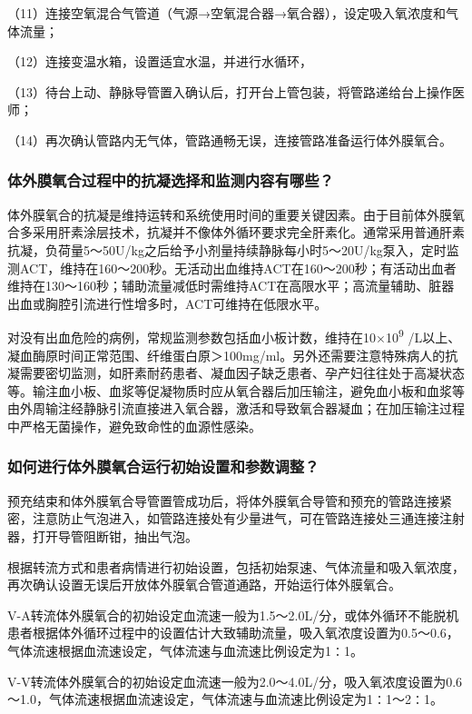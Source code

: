 （11）连接空氧混合气管道（气源→空氧混合器→氧合器），设定吸入氧浓度和气体流量；

（12）连接变温水箱，设置适宜水温，并进行水循环，

（13）待台上动、静脉导管置入确认后，打开台上管包装，将管路递给台上操作医师；

（14）再次确认管路内无气体，管路通畅无误，连接管路准备运行体外膜氧合。

\subsubsection{体外膜氧合过程中的抗凝选择和监测内容有哪些？}

体外膜氧合的抗凝是维持运转和系统使用时间的重要关键因素。由于目前体外膜氧合多采用肝素涂层技术，抗凝并不像体外循环要求完全肝素化。通常采用普通肝素抗凝，负荷量5～50U/kg之后给予小剂量持续静脉每小时5～20U/kg泵入，定时监测ACT，维持在160～200秒。无活动出血维持ACT在160～200秒；有活动出血者维持在130～160秒；辅助流量减低时需维持ACT在高限水平；高流量辅助、脏器出血或胸腔引流进行性增多时，ACT可维持在低限水平。

对没有出血危险的病例，常规监测参数包括血小板计数，维持在10×10\textsuperscript{9}
/L以上、凝血酶原时间正常范围、纤维蛋白原＞100mg/ml。另外还需要注意特殊病人的抗凝需要密切监测，如肝素耐药患者、凝血因子缺乏患者、孕产妇往往处于高凝状态等。输注血小板、血浆等促凝物质时应从氧合器后加压输注，避免血小板和血浆等由外周输注经静脉引流直接进入氧合器，激活和导致氧合器凝血；在加压输注过程中严格无菌操作，避免致命性的血源性感染。

\subsubsection{如何进行体外膜氧合运行初始设置和参数调整？}

预充结束和体外膜氧合导管置管成功后，将体外膜氧合导管和预充的管路连接紧密，注意防止气泡进入，如管路连接处有少量进气，可在管路连接处三通连接注射器，打开导管阻断钳，抽出气泡。

根据转流方式和患者病情进行初始设置，包括初始泵速、气体流量和吸入氧浓度，再次确认设置无误后开放体外膜氧合管道通路，开始运行体外膜氧合。

V-A转流体外膜氧合的初始设定血流速一般为1.5～2.0L/分，或体外循环不能脱机患者根据体外循环过程中的设置估计大致辅助流量，吸入氧浓度设置为0.5～0.6，气体流速根据血流速设定，气体流速与血流速比例设定为1∶1。

V-V转流体外膜氧合的初始设定血流速一般为2.0～4.0L/分，吸入氧浓度设置为0.6～1.0，气体流速根据血流速设定，气体流速与血流速比例设定为1∶1～2∶1。


